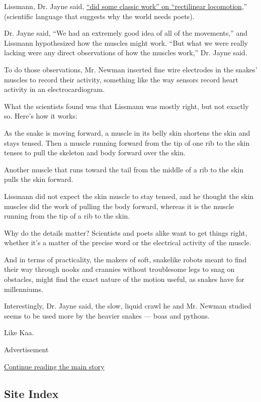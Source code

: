 Lissmann, Dr. Jayne said,
\href{http://jeb.biologists.org/content/jexbio/26/4/368.full.pdf}{``did
some classic work'' on ``rectilinear locomotion,}'' (scientific language
that suggests why the world needs poets).

Dr. Jayne said, ``We had an extremely good idea of all of the
movements,'' and Lissmann hypothesized how the muscles might work. ``But
what we were really lacking were any direct observations of how the
muscles work,'' Dr. Jayne said.

To do those observations, Mr. Newman inserted fine wire electrodes in
the snakes' muscles to record their activity, something like the way
sensors record heart activity in an electrocardiogram.

What the scientists found was that Lissmann was mostly right, but not
exactly so. Here's how it works:

As the snake is moving forward, a muscle in its belly skin shortens the
skin and stays tensed. Then a muscle running forward from the tip of one
rib to the skin tenses to pull the skeleton and body forward over the
skin.

Another muscle that runs toward the tail from the middle of a rib to the
skin pulls the skin forward.

Lissmann did not expect the skin muscle to stay tensed, and he thought
the skin muscles did the work of pulling the body forward, whereas it is
the muscle running from the tip of a rib to the skin.

Why do the details matter? Scientists and poets alike want to get things
right, whether it's a matter of the precise word or the electrical
activity of the muscle.

And in terms of practicality, the makers of soft, snakelike robots meant
to find their way through nooks and crannies without troublesome legs to
snag on obstacles, might find the exact nature of the motion useful, as
snakes have for millenniums.

Interestingly, Dr. Jayne said, the slow, liquid crawl he and Mr. Newman
studied seems to be used more by the heavier snakes --- boas and
pythons.

Like Kaa.

Advertisement

\protect\hyperlink{after-bottom}{Continue reading the main story}

\hypertarget{site-index}{%
\subsection{Site Index}\label{site-index}}

